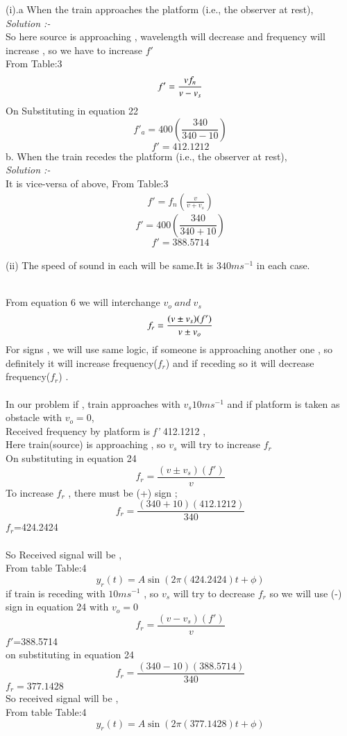 \documentclass[journal,12pt,twocolumn]{IEEEtran}
\theoremstyle{remark}
\begin{document}
(i).a When the train approaches the platform (i.e., the observer at rest),\\
\textit{Solution  :-}\\
So here source is approaching , wavelength will decrease and frequency will increase , so we have to increase $f' $\\
From Table:3
\begin{align}{\label{eq22}}f' = \frac{v f_n}{v- v_s }\end{align}
On Substituting in equation 22
$$f'_a=400(\frac{340}{340-10})$$
$$f'=412.1212$$
\bigskip
b. When the train recedes the platform (i.e., the observer at rest), \\
\textit{Solution  :-}\\
It is vice-versa of above, From Table:3
\begin{align}f'=f_n(\frac{v}{v+v_s})\end{align}
$$f'=400(\frac{340}{340+10})$$
$$f'=388.5714$$\\
(ii) The speed of sound in each will be same.It is $340  ms^{-1}$ in each case.\\\\
 \begin{table}[h!]
   
        
       
    \end{table}
From equation 6
we will interchange $v_o\; and\; v_s$ 
\begin{align}{\label{eq24}}f_r = \frac{(v \pm v_s)(f')}{v \pm v_o }\end{align}
For signs , we will use same logic, if someone is approaching another one , so definitely it will increase frequency($f_r$) and if receding so it will decrease frequency($f_r$) . \\\\
 In our problem  if , train approaches with $v_s10 ms^{-1} $ and if platform is taken as obstacle with $v_o=0$, \\
 Received frequency by platform is \textit{f'} 412.1212   , \\
 Here train(source) is approaching , so $v_s$ will try to increase $f_r$\\
On substituting in  equation 24
 $$f_r = \frac{(v \pm v_s)(f')}{v }$$
 To increase $f_r$ , there must be (+) sign ;
 $$f_r = \frac{(340 + 10)(412.1212)}{340 }$$
 $f_r$=424.2424\\ \\So Received signal will be , \\
 From table Table:4
 $$y_r(t) = A\sin{( 2 \pi  (424.2424)t + \phi )}$$
 if train is receding with $10 ms^{-1} $ , so $v_s$ will try to decrease $f_r$
 so we will use (-) sign in equation 24 with $v_o=0$\\
  $$f_r = \frac{(v -v_s)(f')}{v }$$
  $f'$=388.5714 \\
  on substituting in equation  24
  $$f_r = \frac{(340 -10)(388.5714)}{340 }$$
  $f_r=377.1428$
 \\ So received signal will be , \\
 From table Table:4
 $$y_r(t) = A\sin{( 2 \pi  (377.1428)t + \phi )}$$
\end{document}
